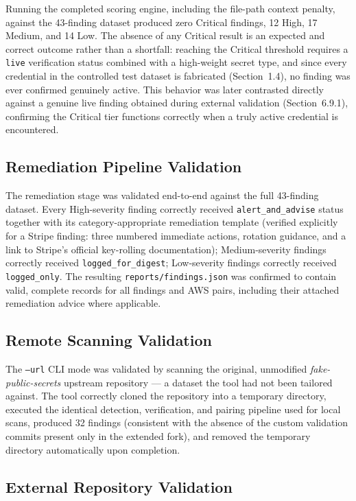\documentclass[12pt]{article}
\begin{document}
Running the completed scoring engine, including the file-path context penalty, against the 43-finding dataset produced zero Critical findings, 12 High, 17 Medium, and 14 Low. The absence of any Critical result is an expected and correct outcome rather than a shortfall: reaching the Critical threshold requires a \texttt{live} verification status combined with a high-weight secret type, and since every credential in the controlled test dataset is fabricated (Section~1.4), no finding was ever confirmed genuinely active. This behavior was later contrasted directly against a genuine live finding obtained during external validation (Section~6.9.1), confirming the Critical tier functions correctly when a truly active credential is encountered.

\subsection{Remediation Pipeline Validation}

The remediation stage was validated end-to-end against the full 43-finding dataset. Every High-severity finding correctly received \texttt{alert\_and\_advise} status together with its category-appropriate remediation template (verified explicitly for a Stripe finding: three numbered immediate actions, rotation guidance, and a link to Stripe's official key-rolling documentation); Medium-severity findings correctly received \texttt{logged\_for\_digest}; Low-severity findings correctly received \texttt{logged\_only}. The resulting \texttt{reports/findings.json} was confirmed to contain valid, complete records for all findings and AWS pairs, including their attached remediation advice where applicable.

\subsection{Remote Scanning Validation}

The \texttt{--url} CLI mode was validated by scanning the original, unmodified \emph{fake-public-secrets} upstream repository --- a dataset the tool had not been tailored against. The tool correctly cloned the repository into a temporary directory, executed the identical detection, verification, and pairing pipeline used for local scans, produced 32 findings (consistent with the absence of the custom validation commits present only in the extended fork), and removed the temporary directory automatically upon completion.

\subsection{External Repository Validation}
\end{document}
